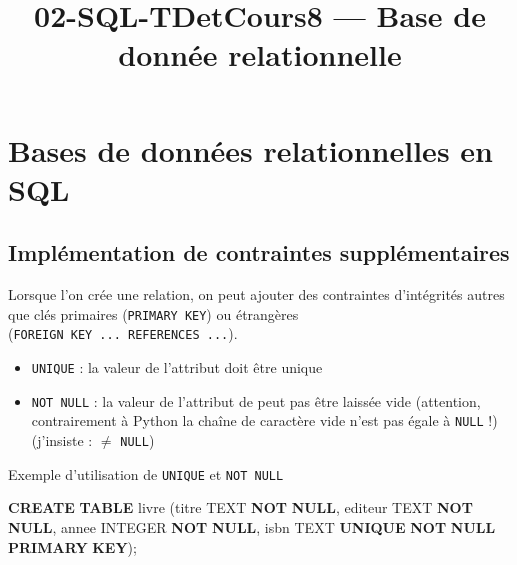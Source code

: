\documentclass[a4paper,17pt]{extarticle}
\title{02-SQL-TDetCours}
\providecommand{\tightlist}{%
      \setlength{\itemsep}{0pt}\setlength{\parskip}{0pt}}
\newenvironment{Shaded}{}{}
\newcommand{\KeywordTok}[1]{\textcolor[rgb]{0.00,0.44,0.13}{\textbf{{#1}}}}
\newcommand{\DataTypeTok}[1]{\textcolor[rgb]{0.56,0.13,0.00}{{#1}}}
\newcommand{\NormalTok}[1]{{#1}}
\begin{document}
    
    \title{8 --- Base de donnée relationnelle}

    
    

    
    \hypertarget{bases-de-donnuxe9es-relationnelles-en-sql}{%
\section{Bases de données relationnelles en
SQL}\label{bases-de-donnuxe9es-relationnelles-en-sql}}

    \hypertarget{impluxe9mentation-de-contraintes-suppluxe9mentaires}{%
\subsection{Implémentation de contraintes
supplémentaires}\label{impluxe9mentation-de-contraintes-suppluxe9mentaires}}

    Lorsque l'on crée une relation, on peut ajouter des contraintes
d'intégrités autres que clés primaires (\texttt{PRIMARY\ KEY}) ou
étrangères (\texttt{FOREIGN\ KEY\ ...\ REFERENCES\ ...}).

\begin{itemize}
\tightlist
\item
  \texttt{UNIQUE} : la valeur de l'attribut doit être unique
\item
  \texttt{NOT\ NULL} : la valeur de l'attribut de peut pas être laissée
  vide (attention, contrairement à Python la chaîne de caractère vide
  \texttt{\textquotesingle{}\textquotesingle{}} n'est pas égale à
  \texttt{NULL} !)(j'insiste :
  \texttt{\textquotesingle{}\textquotesingle{}} \(\neq\) \texttt{NULL})
\end{itemize}

    Exemple d'utilisation de \texttt{UNIQUE} et \texttt{NOT\ NULL}

\begin{Shaded}
\begin{Highlighting}[]
\KeywordTok{CREATE} \KeywordTok{TABLE}\NormalTok{ livre (titre TEXT }\KeywordTok{NOT} \KeywordTok{NULL}\NormalTok{,}
\NormalTok{                    editeur TEXT }\KeywordTok{NOT} \KeywordTok{NULL}\NormalTok{,}
\NormalTok{                    annee }\DataTypeTok{INTEGER} \KeywordTok{NOT} \KeywordTok{NULL}\NormalTok{,}
\NormalTok{                    isbn TEXT }\KeywordTok{UNIQUE} \KeywordTok{NOT} \KeywordTok{NULL} \KeywordTok{PRIMARY} \KeywordTok{KEY}\NormalTok{);}
\end{Highlighting}
\end{Shaded}
\end{document}
